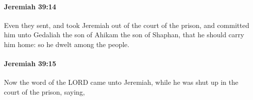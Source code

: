 		\paragraph{Jeremiah 39:14} %
			\label{JEREMIAH-39-14}

			Even they sent, and took Jeremiah out of the court of the prison, and committed him unto Gedaliah the son of Ahikam the son of Shaphan, that he should carry him home: so he dwelt among the people.


		\paragraph{Jeremiah 39:15} %
			\label{JEREMIAH-39-15}

			Now the word of the LORD came unto Jeremiah, while he was shut up in the court of the prison, saying,


